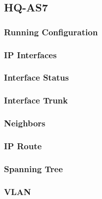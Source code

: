 \subsection{HQ-AS7}
\subsubsection{Running Configuration}


\subsubsection{IP Interfaces}


\subsubsection{Interface Status}


\subsubsection{Interface Trunk}


\subsubsection{Neighbors}


\subsubsection{IP Route}


\subsubsection{Spanning Tree}


\subsubsection{VLAN}




